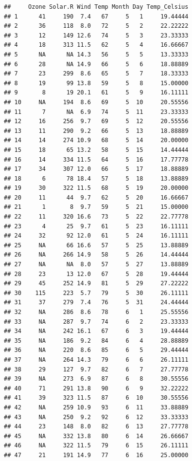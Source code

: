 \documentclass[11pt,]{book}
\begin{document}
\begin{verbatim}
##     Ozone Solar.R Wind Temp Month Day Temp_Celsius
## 1      41     190  7.4   67     5   1     19.44444
## 2      36     118  8.0   72     5   2     22.22222
## 3      12     149 12.6   74     5   3     23.33333
## 4      18     313 11.5   62     5   4     16.66667
## 5      NA      NA 14.3   56     5   5     13.33333
## 6      28      NA 14.9   66     5   6     18.88889
## 7      23     299  8.6   65     5   7     18.33333
## 8      19      99 13.8   59     5   8     15.00000
## 9       8      19 20.1   61     5   9     16.11111
## 10     NA     194  8.6   69     5  10     20.55556
## 11      7      NA  6.9   74     5  11     23.33333
## 12     16     256  9.7   69     5  12     20.55556
## 13     11     290  9.2   66     5  13     18.88889
## 14     14     274 10.9   68     5  14     20.00000
## 15     18      65 13.2   58     5  15     14.44444
## 16     14     334 11.5   64     5  16     17.77778
## 17     34     307 12.0   66     5  17     18.88889
## 18      6      78 18.4   57     5  18     13.88889
## 19     30     322 11.5   68     5  19     20.00000
## 20     11      44  9.7   62     5  20     16.66667
## 21      1       8  9.7   59     5  21     15.00000
## 22     11     320 16.6   73     5  22     22.77778
## 23      4      25  9.7   61     5  23     16.11111
## 24     32      92 12.0   61     5  24     16.11111
## 25     NA      66 16.6   57     5  25     13.88889
## 26     NA     266 14.9   58     5  26     14.44444
## 27     NA      NA  8.0   57     5  27     13.88889
## 28     23      13 12.0   67     5  28     19.44444
## 29     45     252 14.9   81     5  29     27.22222
## 30    115     223  5.7   79     5  30     26.11111
## 31     37     279  7.4   76     5  31     24.44444
## 32     NA     286  8.6   78     6   1     25.55556
## 33     NA     287  9.7   74     6   2     23.33333
## 34     NA     242 16.1   67     6   3     19.44444
## 35     NA     186  9.2   84     6   4     28.88889
## 36     NA     220  8.6   85     6   5     29.44444
## 37     NA     264 14.3   79     6   6     26.11111
## 38     29     127  9.7   82     6   7     27.77778
## 39     NA     273  6.9   87     6   8     30.55556
## 40     71     291 13.8   90     6   9     32.22222
## 41     39     323 11.5   87     6  10     30.55556
## 42     NA     259 10.9   93     6  11     33.88889
## 43     NA     250  9.2   92     6  12     33.33333
## 44     23     148  8.0   82     6  13     27.77778
## 45     NA     332 13.8   80     6  14     26.66667
## 46     NA     322 11.5   79     6  15     26.11111
## 47     21     191 14.9   77     6  16     25.00000

\end{verbatim}
\end{document}
